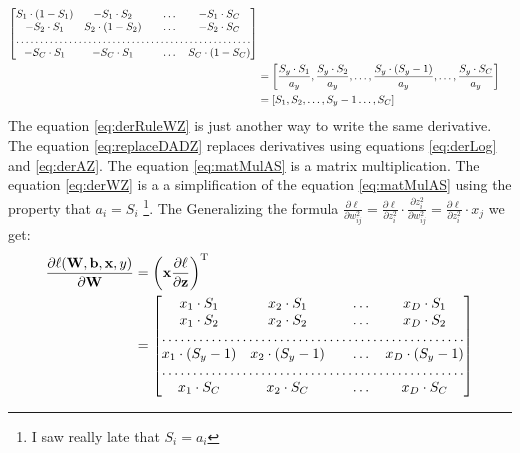 \documentclass[10pt,a4paper]{article}
\begin{document}
\begin{enumerate}
\begin{align}
\begin{bmatrix}
    S_1 \cdot (1- S_1)    & 
-S_1 \cdot S_2      &  & \dots & -S_1\cdot S_C \\
- S_2 \cdot S_1    & 
S_2 \cdot (1 - S_2)      &  & \dots & -S_2 \cdot S_C \\
    \hdotsfor{5} \\
        -S_C \cdot S_1    & 
-S_C \cdot S_1      &  & \dots & S_C \cdot (1 - S_C) \\
\end{bmatrix} 
\label{eq:replaceDADZ}\\
&= \left[ \frac{S_y\cdot S_1 }{a_y},\frac{S_y \cdot S_2 }{a_y}, \dots, \frac{S_y \cdot (S_y - 1) }{a_y}, \dots, \frac{S_y \cdot S_C }{a_y}\right]
\label{eq:matMulAS}\\
&=  \left[ S_1 ,S_2, \dots, S_y - 1 \dots, S_C \right]
\label{eq:derWZ}
\end{align}
The equation \ref{eq:derRuleWZ} is just another way to write the same derivative. 
The equation \ref{eq:replaceDADZ} replaces derivatives using equations \ref{eq:derLog} and \ref{eq:derAZ}. The equation \ref{eq:matMulAS} is a matrix multiplication.  The equation \ref{eq:derWZ} is a a simplification of the equation \ref{eq:matMulAS} using the property that $a_i = S_i$ \footnote{I saw really late that $S_i = a_i$}. The Generalizing the formula $\frac { \partial \ell } { \partial w _ { i j } ^ { 2 } } = \frac { \partial \ell } { \partial z _ { i } ^ { 2 } } \cdot \frac { \partial z _ { i } ^ { 2 } } { \partial w _ { i j } ^ { 2 } } = \frac { \partial \ell } { \partial z _ { i } ^ { 2 } } \cdot x _ { j }$ we get:
\begin{align}
\frac{\partial \ell (\mat{W}, \vect{b}, \vect{x}, y)}{\partial \mat{W}} 
&=\transpose{\left( \vect{x} \frac{\partial \ell}{\partial \vect{z}}\right)} \nonumber \\
&=\begin{bmatrix}
    x_1 \cdot S_1   & 
x_2 \cdot S_1      &  & \dots  & x_D\cdot S_1 \\
 x_1 \cdot S_2    & 
x_2 \cdot S_2 &  & \dots & x_D \cdot S_2 \\
    \hdotsfor{5} \\
     x_1 \cdot (S_y -1)    & 
x_2 \cdot (S_y -1) &  & \dots & x_D \cdot (S_y -1) \\
    \hdotsfor{5} \\
        x_1 \cdot S_C    & 
x_2 \cdot S_C &     &  \dots& x_D \cdot  S_C \\
\end{bmatrix}\label{eq:matMulXLZ}
\end{align}

\end{enumerate}
\end{document}
